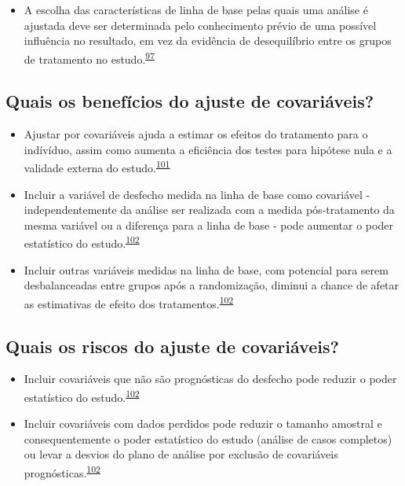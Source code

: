 \documentclass[
]{book}
\providecommand{\tightlist}{%
  \setlength{\itemsep}{0pt}\setlength{\parskip}{0pt}}
\begin{document}
\begin{itemize}
\tightlist
\item
  A escolha das características de linha de base pelas quais uma análise é ajustada deve ser determinada pelo conhecimento prévio de uma possível influência no resultado, em vez da evidência de desequilíbrio entre os grupos de tratamento no estudo.\textsuperscript{\protect\hyperlink{ref-roberts1999}{97}}
\end{itemize}

\hypertarget{quais-os-benefuxedcios-do-ajuste-de-covariuxe1veis}{%
\subsection{Quais os benefícios do ajuste de covariáveis?}\label{quais-os-benefuxedcios-do-ajuste-de-covariuxe1veis}}

\begin{itemize}
\item
  Ajustar por covariáveis ajuda a estimar os efeitos do tratamento para o indívíduo, assim como aumenta a eficiência dos testes para hipótese nula e a validade externa do estudo.\textsuperscript{\protect\hyperlink{ref-Hauck1998}{101}}
\item
  Incluir a variável de desfecho medida na linha de base como covariável - independentemente da análise ser realizada com a medida pós-tratamento da mesma variável ou a diferença para a linha de base - pode aumentar o poder estatístico do estudo.\textsuperscript{\protect\hyperlink{ref-Kahan2014}{102}}
\item
  Incluir outras variáveis medidas na linha de base, com potencial para serem desbalanceadas entre grupos após a randomização, diminui a chance de afetar as estimativas de efeito dos tratamentos.\textsuperscript{\protect\hyperlink{ref-Kahan2014}{102}}
\end{itemize}

\hypertarget{quais-os-riscos-do-ajuste-de-covariuxe1veis}{%
\subsection{Quais os riscos do ajuste de covariáveis?}\label{quais-os-riscos-do-ajuste-de-covariuxe1veis}}

\begin{itemize}
\item
  Incluir covariáveis que não são prognósticas do desfecho pode reduzir o poder estatístico do estudo.\textsuperscript{\protect\hyperlink{ref-Kahan2014}{102}}
\item
  Incluir covariáveis com dados perdidos pode reduzir o tamanho amostral e consequentemente o poder estatístico do estudo (análise de casos completos) ou levar a desvios do plano de análise por exclusão de covariáveis prognósticas.\textsuperscript{\protect\hyperlink{ref-Kahan2014}{102}}
\end{itemize}
\end{document}
